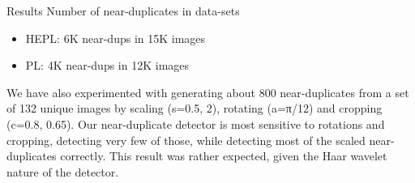 

\begin{xpsectionbox}{Results}{}
Number of near-duplicates in data-sets %
\begin{itemize}
	\item HEPL: 6K near-dups in 15K images
	\item PL: 4K near-dups in 12K images
\end{itemize}
We have also experimented with generating about 800 near-duplicates from a set of 132 unique images by scaling (s=0.5, 2), rotating (a=π/12) and cropping (c=0.8, 0.65). Our near-duplicate detector is most sensitive to rotations and cropping, detecting very few of those, while detecting most of the scaled near-duplicates correctly. This result was rather expected, given the Haar wavelet nature of the detector.
\end{xpsectionbox}